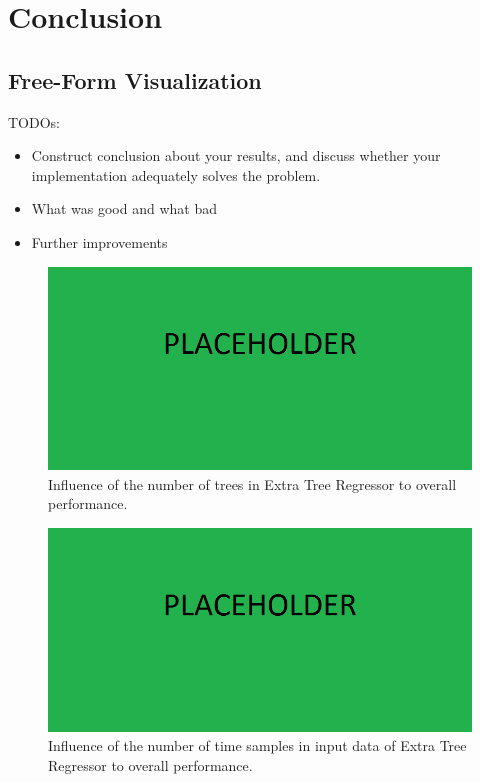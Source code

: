 \documentclass{article}
\begin{document}
\section{Conclusion}

\subsection{Free-Form Visualization}
\color{red}
TODOs:
\begin{itemize}
    \item Construct conclusion about your results, and discuss whether your implementation adequately solves the problem.
    \item What was good and what bad
    \item Further improvements
\end{itemize}
\color{black}

\begin{figure}[h!]
\centering
\includegraphics[width=16cm]{imgs/placeholder.png}
\caption{Influence of the number of trees in Extra Tree Regressor to overall performance.}
\label{fig:number_of_trees}
\end{figure}

\begin{figure}[h!]
\centering
\includegraphics[width=16cm]{imgs/placeholder.png}
\caption{Influence of the number of time samples in input data of Extra Tree Regressor to overall performance.}
\label{fig:number_of_trees}
\end{figure}
\end{document}
